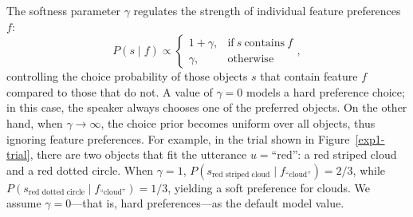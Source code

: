 \documentclass[10pt,a4paper]{article}
\begin{document}
The softness parameter $\gamma$ regulates the strength of individual feature preferences $f$:
$$ P(s \mid f) \propto \begin{cases}
1 + \gamma, & \text{if}\ s\ \text{contains}\ f \\
\gamma, & \text{otherwise}
\end{cases},$$
controlling the choice probability of those objects $s$ that contain feature $f$ compared to those that do not.  
A value of $\gamma=0$ models a hard preference choice; in this case, the speaker always chooses one of the preferred objects. 
On the other hand, when $\gamma \rightarrow \infty$, the choice prior becomes uniform over all objects, thus ignoring feature preferences. 
For example, in the trial shown in Figure~\ref{exp1-trial}, there are two objects that fit the utterance $u=\text{``red''}$: a red striped cloud and a red dotted circle.
When $\gamma=1$, $P(s_{\textrm{red\ striped\ cloud}}\mid f_{\textrm{``cloud''}}) = 2/3$, while
$P(s_{\textrm{red\ dotted\ circle}}\mid f_{\textrm{``cloud''}})= 1/3$, yielding a soft preference for clouds.
We assume $\gamma=0$---that is, hard preferences---as the default model value.
\end{document}
